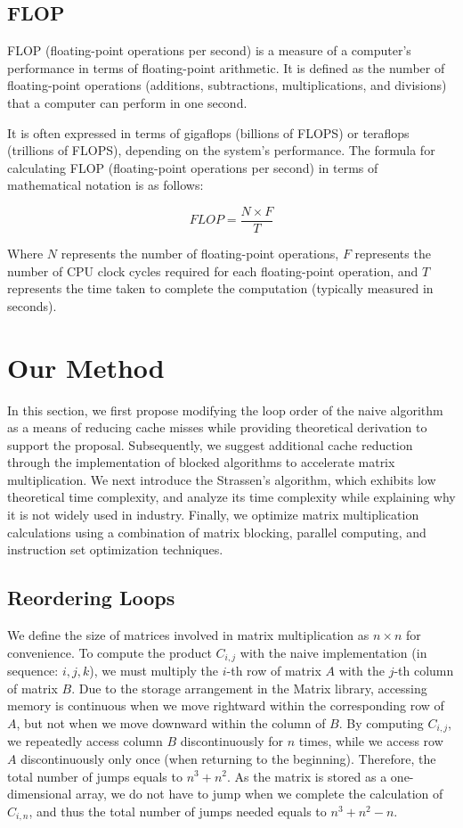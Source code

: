 \documentclass[conference]{IEEEtran}
\begin{document}
	\subsection{FLOP} 
	
	FLOP (floating-point operations per second) is a measure of a computer's performance in terms of floating-point arithmetic. It is defined as the number of floating-point operations (additions, subtractions, multiplications, and divisions) that a computer can perform in one second.
	
	It is often expressed in terms of gigaflops (billions of FLOPS) or teraflops (trillions of FLOPS), depending on the system's performance. The formula for calculating FLOP (floating-point operations per second) in terms of mathematical notation is as follows:
	
	\begin{equation}
		FLOP = \frac{N \times F}{T}
	\end{equation}
	
	
	Where $N$ represents the number of floating-point operations, $F$ represents the number of CPU clock cycles required for each floating-point operation, and $T$ represents the time taken to complete the computation (typically measured in seconds).
	
	\section{Our Method}
	In this section, we first propose modifying the loop order of the naive algorithm as a means of reducing cache misses while providing theoretical derivation to support the proposal. Subsequently, we suggest additional cache reduction through the implementation of blocked algorithms to accelerate matrix multiplication. We next introduce the Strassen's algorithm, which exhibits low theoretical time complexity, and analyze its time complexity while explaining why it is not widely used in industry. Finally, we optimize matrix multiplication calculations using a combination of matrix blocking, parallel computing, and instruction set optimization techniques.
	
	\subsection{Reordering Loops}
	We define the size of matrices involved in matrix multiplication as $n \times n$ for convenience. To compute the product $C_{i,j}$ with the naive implementation (in sequence: $i, j, k$), we must multiply the $i$-th row of matrix $A$ with the $j$-th column of matrix $B$. Due to the storage arrangement in the Matrix library, accessing memory is continuous when we move rightward within the corresponding row of $A$, but not when we move downward within the column of $B$. By computing $C_{i,j}$, we repeatedly access column $B$ discontinuously for $n$ times, while we access row $A$ discontinuously only once (when returning to the beginning). Therefore, the total number of jumps equals to $n^3 + n^2$. As the matrix is stored as a one-dimensional array, we do not have to jump when we complete the calculation of $C_{i,n}$, and thus the total number of jumps needed equals to $n^3 + n^2 - n$.
	
\end{document}
